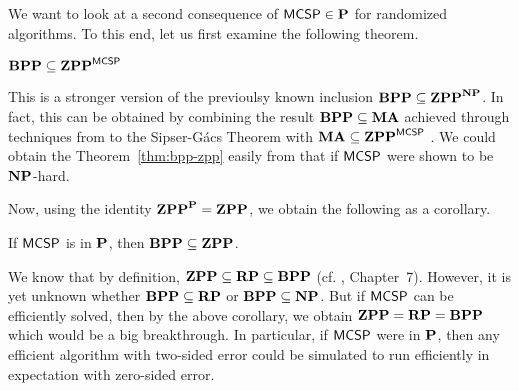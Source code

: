 \documentclass[11pt]{article}
\begin{document}



\bigskip

We want to look at a second consequence of $\mathprob{MCSP} \in \P$
for randomized algorithms.
To this end,
let us first examine the following theorem.

\begin{theorem}[\cite{10.1145/335305.335314}]
  \label{thm:bpp-zpp}
	$\BPP \subseteq \ZPP^{\mathprob{MCSP}}$
\end{theorem}

This is a stronger version of the previoulsy known inclusion
$\BPP \subseteq \ZPP^{\NP}$.
In fact, this can be obtained by combining the result
$\BPP \subseteq \MA$ achieved through techniques from to the Sipser-G\'acs
Theorem with $\MA \subseteq \ZPP^{\mathprob{MCSP}}$ \cite{goldreich97}.
We could obtain the Theorem~\ref{thm:bpp-zpp} easily from that if
$\mathprob{MCSP}$ were shown to be $\NP$-hard.

Now, using the identity $\ZPP^\P = \ZPP$, we obtain the following as a corollary.

\begin{corollary}
	If $\mathprob{MCSP}$ is in $\P$, then $\BPP \subseteq \ZPP$.
\end{corollary}

We know that by definition, $\ZPP \subseteq \RP \subseteq \BPP$
(cf. \cite{arora2009}, Chapter~7).
However, it is yet unknown whether
$\BPP \subseteq \RP$ or $\BPP \subseteq \NP$.
But if $\mathprob{MCSP}$ can be
efficiently solved, then by the above corollary, we obtain $\ZPP = \RP = \BPP$
which would be a big breakthrough.
%
In particular, if $\mathprob{MCSP}$ were in $\P$, then any efficient algorithm
with two-sided error could be simulated to run efficiently in
expectation with zero-sided error.
\end{document}
